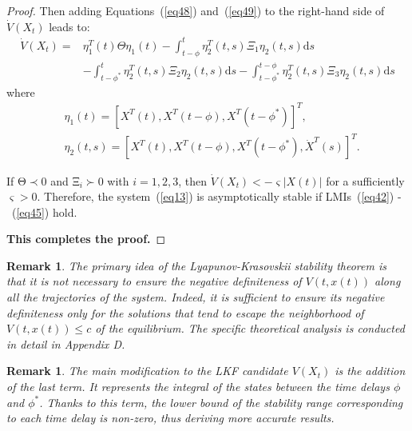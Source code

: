 \documentclass[journal]{IEEEtran}
\newtheorem{remark}[theorem]{Remark}
\begin{document}
\begin{proof}
  Then adding Equations~(\ref{eq48}) and~(\ref{eq49}) to the right-hand side of $\dot{V}\left(X_t\right)$ leads to:
  \begin{equation}
    \begin{aligned}
    \dot V\left( {{X_t}} \right) =& \eta _1^{T}(t)\Theta {\eta _1}(t) - \int_{t - \phi }^t {\eta _2^{T}} (t,s){\Xi _1}{\eta _2}(t,s){\text{d}}s \\
    & - \int_{t - {\phi ^*}}^t {\eta _2^{T}} (t,s){\Xi _2}{\eta _2}(t,s){\text{d}}s - \int_{t - {\phi ^*}}^{t - \phi } {\eta _2^{T}} (t,s){\Xi _3}{\eta _2}(t,s){\text{d}}s
    \end{aligned}
    \label{eq410}
  \end{equation}
  where
  \begin{equation*}
    \begin{aligned}
       & {\eta _1}(t) = {\left[ {{X^{T}}(t),{X^{T}}\left( {t - \phi } \right),{X^{T}}\left( {t - {\phi ^*}} \right)} \right]^{T}},                     \\
       & {\eta _2}(t,s) = {\left[ {{X^{T}}(t),{X^{T}}\left( {t - \phi } \right),{X^{T}}\left( {t - {\phi ^*}} \right),{{\dot X}^{T}}(s)} \right]^{T}}.
    \end{aligned}
  \end{equation*}

  If $\mathrm{\Theta} \prec 0$ and $\mathrm{\Xi}_i\succ0$ with $i=1,2,3$, then $\dot{V}\left(X_t\right)<-\varsigma\left|X(t)\right|$ for a sufficiently $\varsigma>0$. Therefore, the system~(\ref{eq13}) is asymptotically stable if LMIs~(\ref{eq42}) -~(\ref{eq45}) hold.

  \textbf{This completes the proof.}

\end{proof}

\begin{remark}
  \label{remarkdiff}
  The primary idea of the Lyapunov-Krasovskii stability theorem is that it is not necessary to ensure the negative definiteness of $V\left(t,x\left(t\right)\right)$ along all the trajectories of the system. Indeed, it is sufficient to ensure its negative definiteness only for the solutions that tend to escape the neighborhood of $V\left(t,x\left(t\right)\right)\le c$ of the equilibrium. The specific theoretical analysis is conducted in detail in Appendix D.
\end{remark}

\begin{remark}
  The main modification to the LKF candidate $V\left(X_t\right)$ is the addition of the last term. It represents the integral of the states between the time delays $\phi$ and $\phi^\ast$. Thanks to this term, the lower bound of the stability range corresponding to each time delay is non-zero, thus deriving more accurate results.
\end{remark}
\end{document}
